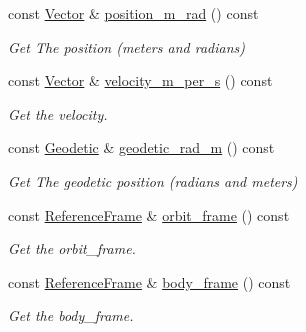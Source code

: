 \begin{DoxyCompactItemize}
const \hyperlink{classosse_1_1collaborate_1_1_vector}{Vector} \& \hyperlink{classosse_1_1collaborate_1_1_orbital_state_a09eef3c4ce4d5a6aff3b6cee6e1dea0e}{position\+\_\+m\+\_\+rad} () const
\begin{DoxyCompactList}\small\item\em Get The position (meters and radians) \end{DoxyCompactList}\item 
const \hyperlink{classosse_1_1collaborate_1_1_vector}{Vector} \& \hyperlink{classosse_1_1collaborate_1_1_orbital_state_a2d52b42f0259367d91e2c247aea9522f}{velocity\+\_\+m\+\_\+per\+\_\+s} () const
\begin{DoxyCompactList}\small\item\em Get the velocity. \end{DoxyCompactList}\item 
const \hyperlink{classosse_1_1collaborate_1_1_geodetic}{Geodetic} \& \hyperlink{classosse_1_1collaborate_1_1_orbital_state_a7a6f749d24d80b5e5c08eb4a03857a31}{geodetic\+\_\+rad\+\_\+m} () const
\begin{DoxyCompactList}\small\item\em Get The geodetic position (radians and meters) \end{DoxyCompactList}\item 
const \hyperlink{classosse_1_1collaborate_1_1_reference_frame}{Reference\+Frame} \& \hyperlink{classosse_1_1collaborate_1_1_orbital_state_a9704e21bdf2ed6245b4b27e5a2911310}{orbit\+\_\+frame} () const
\begin{DoxyCompactList}\small\item\em Get the orbit\+\_\+frame. \end{DoxyCompactList}\item 
const \hyperlink{classosse_1_1collaborate_1_1_reference_frame}{Reference\+Frame} \& \hyperlink{classosse_1_1collaborate_1_1_orbital_state_a28b3414c74ad4ebe11d0e835dc9591ee}{body\+\_\+frame} () const
\begin{DoxyCompactList}\small\item\em Get the body\+\_\+frame. \end{DoxyCompactList}\end{DoxyCompactItemize}
